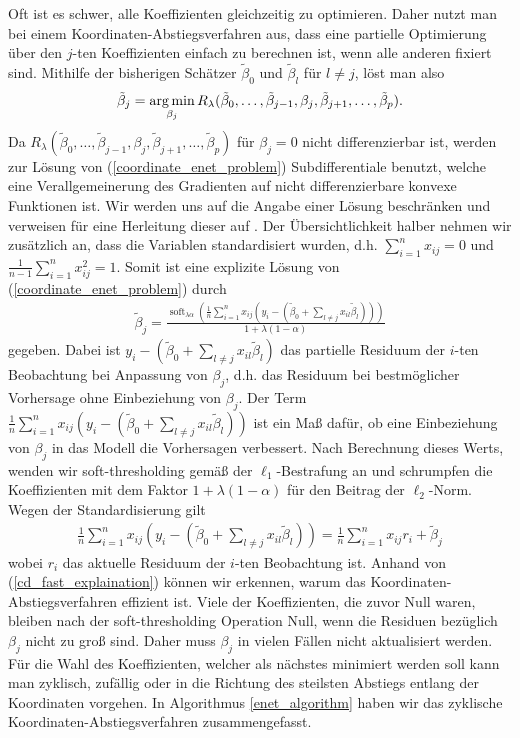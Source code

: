 Oft ist es schwer, alle Koeffizienten gleichzeitig zu optimieren. Daher nutzt man bei einem Koordinaten-Abstiegsverfahren aus, dass eine partielle Optimierung über den $j$-ten Koeffizienten einfach zu berechnen ist, wenn alle anderen fixiert sind. Mithilfe der bisherigen Schätzer $\tilde{\beta}_0$ und $\tilde{\beta}_l$ für $l \neq j$, löst man also
\begin{align}
\label{coordinate_enet_problem}
\tilde{\beta}_j = \operatorname*{arg\,min}_{\beta_j} R_{\lambda}(\tilde{\beta}_0, \ldots, \tilde{\beta}_{j-1}, \beta_j, \tilde{\beta}_{j+1}, \ldots, \tilde{\beta}_p).
\end{align}
Da $R_{\lambda}(\tilde{\beta}_0, \ldots, \tilde{\beta}_{j-1}, \beta_j, \tilde{\beta}_{j+1}, \ldots, \tilde{\beta}_p)$ für $\beta_j = 0$ nicht differenzierbar ist, werden zur Lösung von (\ref{coordinate_enet_problem}) Subdifferentiale benutzt, welche eine Verallgemeinerung des Gradienten auf nicht differenzierbare konvexe Funktionen ist. Wir werden uns auf die Angabe einer Lösung beschränken und verweisen für eine Herleitung dieser auf \cite{donoho}. Der Übersichtlichkeit halber nehmen wir zusätzlich an, dass die Variablen standardisiert wurden, d.h. $\sum_{i=1}^n x_{ij} = 0$ und $\frac{1}{n-1}\sum_{i=1}^n x_{ij}^2 = 1$. Somit ist eine explizite Lösung von (\ref{coordinate_enet_problem}) durch
\begin{align}
\tilde{\beta}_j = \frac{\operatorname{soft}_{\lambda\alpha} (\frac{1}{n}\sum_{i=1}^n x_{ij}(y_i - (\tilde{\beta}_0 + \sum_{l \neq j} x_{il}\tilde{\beta}_l)))}{1 + \lambda (1-\alpha)}
\end{align}
gegeben. Dabei ist $y_i - (\tilde{\beta}_0 + \sum_{l \neq j} x_{il}\tilde{\beta}_l)$ das partielle Residuum der $i$-ten Beobachtung bei Anpassung von $\beta_j$, d.h. das Residuum bei bestmöglicher Vorhersage ohne Einbeziehung von $\beta_j$. Der Term $\frac{1}{n}\sum_{i=1}^n x_{ij}(y_i - (\tilde{\beta}_0 + \sum_{l \neq j} x_{il}\tilde{\beta}_l))$ ist ein Maß dafür, ob eine Einbeziehung von $\beta_j$ in das Modell die Vorhersagen verbessert. Nach Berechnung dieses Werts, wenden wir soft-thresholding gemäß der $\ell_1$-Bestrafung an und schrumpfen die Koeffizienten mit dem Faktor $1+\lambda(1-\alpha)$ für den Beitrag der $\ell_2$-Norm. Wegen der Standardisierung gilt
\begin{align}
\label{cd_fast_explaination}
\frac{1}{n}\sum_{i=1}^n x_{ij}(y_i - (\tilde{\beta}_0 + \sum_{l \neq j} x_{il}\tilde{\beta}_l)) = \frac{1}{n}\sum_{i=1}^n x_{ij}r_i + \tilde{\beta}_j
\end{align}
wobei $r_i$ das aktuelle Residuum der $i$-ten Beobachtung ist. Anhand von (\ref{cd_fast_explaination}) können wir erkennen, warum das Koordinaten-Abstiegsverfahren effizient ist. Viele der Koeffizienten, die zuvor Null waren, bleiben nach der soft-thresholding Operation Null, wenn die Residuen bezüglich $\beta_j$ nicht zu groß sind. Daher muss $\beta_j$ in vielen Fällen nicht aktualisiert werden. Für die Wahl des Koeffizienten, welcher als nächstes minimiert werden soll kann man zyklisch, zufällig oder in die Richtung des steilsten Abstiegs entlang der Koordinaten vorgehen. In Algorithmus \ref{enet_algorithm} haben wir das zyklische Koordinaten-Abstiegsverfahren zusammengefasst.

